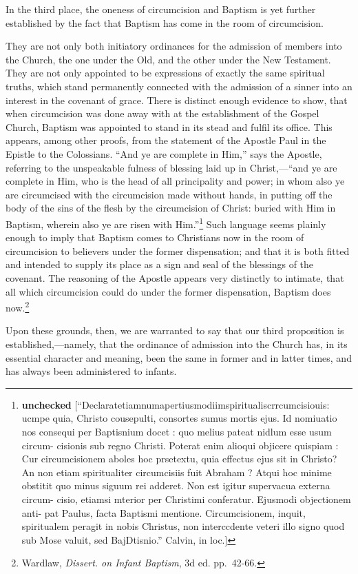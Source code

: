 \documentclass[]{book}
\begin{document}
In the third place, the oneness of circumcision and Baptism is yet further established by the fact that Baptism has come in the room of circumcision.

They are not only both initiatory ordinances for the admission of members into the Church, the one under the Old, and the other under the New Testament. They are not only appointed to be expressions of exactly the same spiritual truths, which stand permanently connected with the admission of a sinner into an interest in the covenant of grace. There is distinct enough evidence to show, that when circumcision was done away with at the establishment of the Gospel Church, Baptism was appointed to stand in its stead and fulfil its office. This appears, among other proofs, from the statement of the Apostle Paul in the Epistle to the Colossians. ``And ye are complete in Him,'' says the Apostle, referring to the unspeakable fulness of blessing laid up in Christ,---``and ye are complete in Him, who is the head of all principality and power; in whom also ye are circumcised with the circumcision made without hands, in putting off the body of the sins of the flesh by the circumcision of Christ: buried with Him in Baptism, wherein also ye are risen with Him.''\footnote{\textbf{unchecked} {[}``Declaratetiamnumapertiusmodiimspiritualiscrrcumcisiouis: ucmpe quia, Christo cousepulti, consortes sumus mortis ejus. Id nomiuatio nos consequi per Baptisnium docet : quo melius pateat nidlum esse usum circum- cisionis sub regno Christi. Poterat enim alioqui objicere quispiam : Cur circumcisionem aboles hoc prsetextu, quia effectus ejus sit in Christo? An non etiam spiritualiter circumcisiis fuit Abraham ? Atqui hoc minime obstitit quo minus siguum rei adderet. Non est igitur supervacua externa circum- cisio, etiamsi mterior per Christimi conferatur. Ejusmodi objectionem anti- pat Paulus, facta Baptismi mentione. Circumcisionem, inquit, spiritualem peragit in nobis Christus, non interccdente veteri illo signo quod sub Mose valuit, sed BajDtisnio.'' Calvin, in loc.{]}} Such language seems plainly enough to imply that Baptism comes to Christians now in the room of circumcision to believers under the former dispensation; and that it is both fitted and intended to supply its place as a sign and seal of the blessings of the covenant. The reasoning of the Apostle appears very distinctly to intimate, that all which circumcision could do under the former dispensation, Baptism does now.\footnote{Wardlaw, \emph{Dissert. on Infant Baptism}, 3d ed. pp.~42-66.}

Upon these grounds, then, we are warranted to say that our third proposition is established,---namely, that the ordinance of admission into the Church has, in its essential character and meaning, been the same in former and in latter times, and has always been administered to infants.
\end{document}
